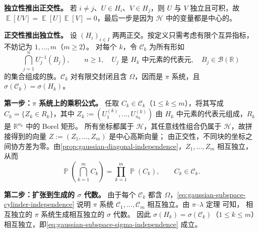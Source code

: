 \documentclass[UTF8,11pt,a4paper,oneside,fontset=fandol]{ctexrep}
\makeatletter
\numberwithin{equation}{section}
\theoremstyle{zhthm}
\renewenvironment{proof}[1][\proofname]{\par
  \pushQED{\qed}%
  \normalfont\topsep6\p@\@plus6\p@\relax
  \trivlist
  \item[\hskip\labelsep\bfseries#1\hspace{0.5em}]\ignorespaces
}{%
  \popQED\endtrivlist\@endpefalse
}
\renewcommand{\proofname}{证明}
\newcommand{\R}{\mathbb{R}}
\newcommand{\B}{\mathcal{B}}
\newcommand{\Hcal}{\mathcal{H}}
\DeclareMathOperator{\Prob}{\mathbb{P}}
\DeclareMathOperator{\E}{\mathbb{E}}
\makeatother
\begin{document}
\begin{proof}
\textbf{独立性推出正交性。}
若 $i\ne j$、$U\in H_i$、$V\in H_j$，则 $U$ 与 $V$ 独立且可积，故
$\E[UV]=\E[U]\E[V]=0$，最后一步是因为 $\Hcal$ 中的变量都是中心的。

\textbf{正交性推出独立性。}
设 $(H_i)_{i\in I}$ 两两正交。按定义只需考虑有限个互异指标，不妨记为 $1,\ldots,m$（$m\ge2$）。
对每个 $k$，令 $\mathcal C_k$ 为所有形如
\[
  \bigcap_{j=1}^{n}U_j^{-1}(B_j),\qquad
  n\ge1,\quad U_j\text{ 是 $H_k$ 中元素的代表元},\quad B_j\in\B(\R)
\]
的集合组成的族。$\mathcal C_k$ 对有限交封闭且含 $\Omega$，因而是 $\pi$ 系统，且 $\sigma(\mathcal C_k)=\sigma(H_k)$。

\textbf{\boldmath 第一步：$\pi$ 系统上的乘积公式。}
任取 $C_k\in\mathcal C_k$（$1\le k\le m$），将其写成 $C_k=\{Z_k\in R_k\}$，其中
$Z_k:=(U^{(k)}_1,\ldots,U^{(k)}_{n_k})$ 由 $H_k$ 中元素的代表元组成，$R_k$ 是 $\R^{n_k}$ 中的 Borel 矩形。
所有坐标都属于 $\Hcal$，其任意线性组合仍属于 $\Hcal$，故拼接得到的向量 $Z:=(Z_1,\ldots,Z_m)$ 是中心高斯向量；
由正交性，不同块的坐标之间协方差为零。由\cref{prop:gaussian-diagonal-independence}，$Z_1,\ldots,Z_m$ 相互独立，从而
\begin{equation}
  \label{eq:gaussian-subspace-cylinder-independence}
  \Prob\!\left(\bigcap_{k=1}^{m}C_k\right)=\prod_{k=1}^{m}\Prob(C_k),
  \qquad C_k\in\mathcal C_k.
\end{equation}

\textbf{\boldmath 第二步：扩张到生成的 $\sigma$ 代数。}
由于每个 $\mathcal C_k$ 都含 $\Omega$，\cref{eq:gaussian-subspace-cylinder-independence} 说明 $\pi$ 系统
$\mathcal C_1,\ldots,\mathcal C_m$ 相互独立。由 $\pi$--$\lambda$ 定理%
\cite[定理 2.1.6，第 46 页；证明见定理 A.1.4，第 456--457 页]{Durrett2019} 可知，
相互独立的 $\pi$ 系统生成相互独立的 $\sigma$ 代数\cite[定理 2.1.7]{Durrett2019}。
因此 $\sigma(H_k)=\sigma(\mathcal C_k)$（$1\le k\le m$）相互独立，即\cref{eq:gaussian-subspace-sigma-independence} 成立。
\end{proof}
\end{document}
